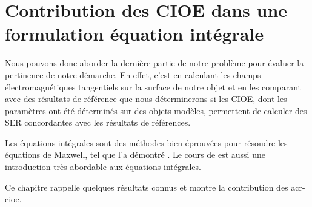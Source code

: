 \chapter{Contribution des CIOE dans une formulation équation intégrale}
\label{sec:equation_integrale}
\minitoc
\newpage
{}
Nous pouvons donc aborder la dernière partie de notre problème pour évaluer la pertinence de notre démarche.
En effet, c'est en calculant les champs électromagnétiques tangentiels sur la surface de notre objet et en les comparant avec des résultats de référence que nous déterminerons si les CIOE, dont les paramètres ont été déterminés sur des objets modèles, permettent de calculer des SER concordantes avec les résultats de références.

Les équations intégrales sont des méthodes bien éprouvées pour résoudre les équations de Maxwell, tel que l'a démontré \cite{nedelec_acoustic_2001}.
Le cours de \cite{bendali_equations_2014} est aussi une introduction très abordable aux équations intégrales.

Ce chapitre rappelle quelques résultats connus et montre la contribution des \gls{acr-cioe}.




